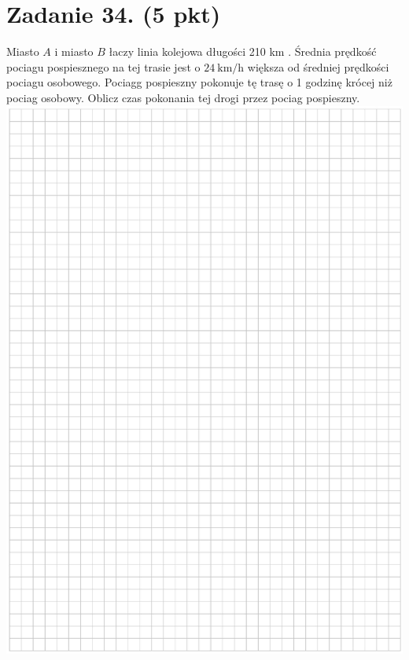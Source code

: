 \documentclass[10pt]{article}
\begin{document}
\section*{Zadanie 34. (5 pkt)}
Miasto \(A\) i miasto \(B\) łaczy linia kolejowa długości 210 km . Średnia prędkość pociagu pospiesznego na tej trasie jest o \(24 \mathrm{~km} / \mathrm{h}\) większa od średniej prędkości pociagu osobowego. Pociagg pospieszny pokonuje tę trasę o 1 godzinę krócej niż pociag osobowy. Oblicz czas pokonania tej drogi przez pociag pospieszny.\\
\includegraphics[max width=\textwidth, center]{2024_11_21_dcf819de2d2eef051a0dg-16}\\
\end{document}
